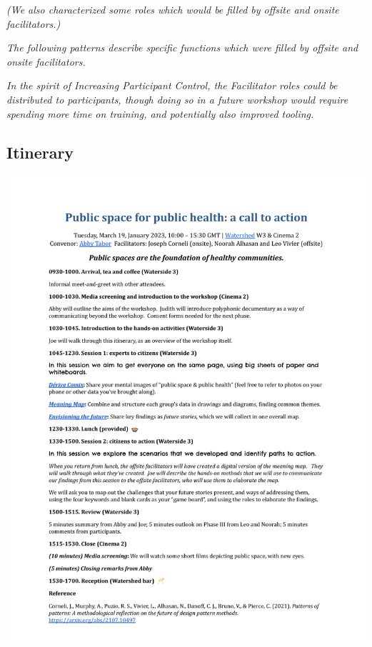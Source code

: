 \documentclass[acmlarge,timestamp]{acmart}
\begin{document}

\smallskip

\noindent \emph{(We also characterized some roles which would be
filled by offsite and onsite facilitators.)}



\smallskip \noindent \emph{The following patterns describe specific
functions which were filled by offsite and onsite facilitators.}





\smallskip \noindent\emph{In the spirit of {\sc Increasing Participant
  Control}, the {\sc Facilitator roles} could be distributed to
participants, though doing so in a future workshop would require
spending more time on training, and potentially also improved
tooling.}

\clearpage
\subsection{Itinerary}

\begin{mdframed}[backgroundcolor=blue!50,linecolor=blue!50]
  \noindent\includegraphics[width=\textwidth,trim={1cm 3.2cm 1cm 4.5cm},clip=true]{bristol}
\end{mdframed}
\end{document}
